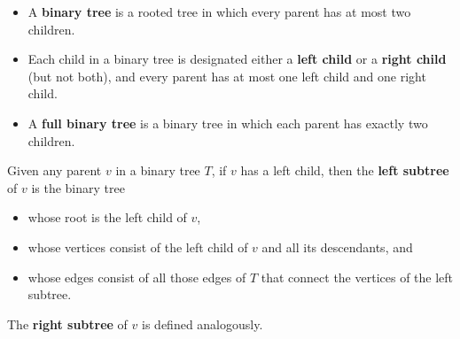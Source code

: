 \documentclass[../mathNotesPreamble]{subfiles}
\begin{document}
  \begin{defn*}
    \begin{itemize}
      \item A \textbf{binary tree} is a rooted tree in which every parent has at most two children.
      \item Each child in a binary tree is designated either a \textbf{left child} or a \textbf{right child} (but not both), and every parent has at most one left child and one right child.
      \item A \textbf{full binary tree} is a binary tree in which each parent has exactly two children.
    \end{itemize}

    Given any parent $v$ in a binary tree $T$, if $v$ has a left child, then the \textbf{left subtree} of $v$ is the binary tree
    \begin{itemize}
      \item whose root is the left child of $v$,
      \item whose vertices consist of the left child of $v$ and all its descendants, and
      \item whose edges consist of all those edges of $T$ that connect the vertices of the left subtree.
    \end{itemize}
    The \textbf{right subtree} of $v$ is defined analogously.
  \end{defn*}

  \begin{center}
  \end{center}
  \pagebreak
\end{document}

